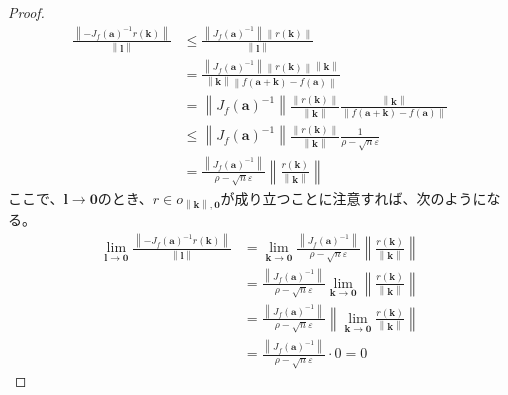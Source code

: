 \documentclass[dvipdfmx]{jsarticle}
\begin{document}
\begin{proof}
\begin{align*}
\frac{\left\| - J_{f}\left( \mathbf{a} \right)^{- 1}r\left( \mathbf{k} \right) \right\|}{\left\| \mathbf{l} \right\|} &\leq \frac{\left\| J_{f}\left( \mathbf{a} \right)^{- 1} \right\|\left\| r\left( \mathbf{k} \right) \right\|}{\left\| \mathbf{l} \right\|}\\
&= \frac{\left\| J_{f}\left( \mathbf{a} \right)^{- 1} \right\|\left\| r\left( \mathbf{k} \right) \right\|\left\| \mathbf{k} \right\|}{\left\| \mathbf{k} \right\|\left\| f\left( \mathbf{a} + \mathbf{k} \right) - f\left( \mathbf{a} \right) \right\|}\\
&= \left\| J_{f}\left( \mathbf{a} \right)^{- 1} \right\|\frac{\left\| r\left( \mathbf{k} \right) \right\|}{\left\| \mathbf{k} \right\|}\frac{\left\| \mathbf{k} \right\|}{\left\| f\left( \mathbf{a} + \mathbf{k} \right) - f\left( \mathbf{a} \right) \right\|}\\
&\leq \left\| J_{f}\left( \mathbf{a} \right)^{- 1} \right\|\frac{\left\| r\left( \mathbf{k} \right) \right\|}{\left\| \mathbf{k} \right\|}\frac{1}{\rho - \sqrt{n}\varepsilon}\\
&= \frac{\left\| J_{f}\left( \mathbf{a} \right)^{- 1} \right\|}{\rho - \sqrt{n}\varepsilon}\left\| \frac{r\left( \mathbf{k} \right)}{\left\| \mathbf{k} \right\|} \right\|
\end{align*}
ここで、$\mathbf{l} \rightarrow \mathbf{0}$のとき、$r \in o_{\left\| \mathbf{k} \right\|,\mathbf{0}}$が成り立つことに注意すれば、次のようになる。
\begin{align*}
\lim_{\mathbf{l} \rightarrow \mathbf{0}}\frac{\left\| - J_{f}\left( \mathbf{a} \right)^{- 1}r\left( \mathbf{k} \right) \right\|}{\left\| \mathbf{l} \right\|} &= \lim_{\mathbf{k} \rightarrow \mathbf{0}}{\frac{\left\| J_{f}\left( \mathbf{a} \right)^{- 1} \right\|}{\rho - \sqrt{n}\varepsilon}\left\| \frac{r\left( \mathbf{k} \right)}{\left\| \mathbf{k} \right\|} \right\|}\\
&= \frac{\left\| J_{f}\left( \mathbf{a} \right)^{- 1} \right\|}{\rho - \sqrt{n}\varepsilon}\lim_{\mathbf{k} \rightarrow \mathbf{0}}\left\| \frac{r\left( \mathbf{k} \right)}{\left\| \mathbf{k} \right\|} \right\|\\
&= \frac{\left\| J_{f}\left( \mathbf{a} \right)^{- 1} \right\|}{\rho - \sqrt{n}\varepsilon}\left\| \lim_{\mathbf{k} \rightarrow \mathbf{0}}\frac{r\left( \mathbf{k} \right)}{\left\| \mathbf{k} \right\|} \right\|\\
&= \frac{\left\| J_{f}\left( \mathbf{a} \right)^{- 1} \right\|}{\rho - \sqrt{n}\varepsilon} \cdot 0 = 0

\end{align*}
\end{proof}
\end{document}
